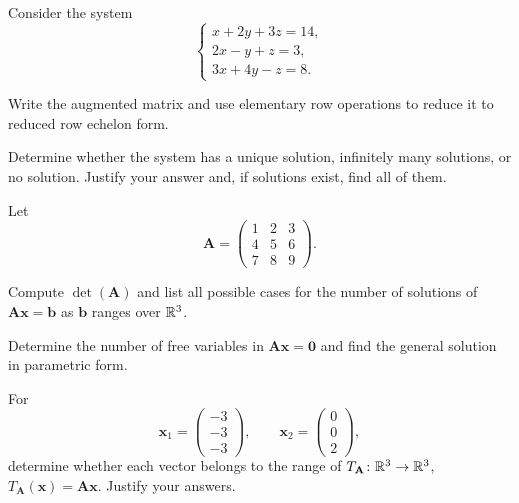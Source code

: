 \begin{problem}
Consider the system
\[
\begin{cases}
x+2y+3z=14,\\
2x-y+z=3,\\
3x+4y-z=8.
\end{cases}
\]
\begin{problemsubparts}
\item Write the augmented matrix and use elementary row operations to reduce it to reduced row echelon form.
\item Determine whether the system has a unique solution, infinitely many solutions, or no solution. Justify your answer and, if solutions exist, find all of them.
\end{problemsubparts}
\end{problem}

\begin{problem}
Let
\[
\mathbf A=
\begin{pmatrix}
1&2&3\\
4&5&6\\
7&8&9
\end{pmatrix}.
\]
\begin{problemsubparts}
\item Compute $\det(\mathbf A)$ and list all possible cases for the number of solutions of $\mathbf A\mathbf x=\mathbf b$ as $\mathbf b$ ranges over $\mathbb{R}^3$.
\item Determine the number of free variables in $\mathbf A\mathbf x=\mathbf0$ and find the general solution in parametric form.
\item For
\[
\mathbf x_1=\begin{pmatrix}-3\\-3\\-3\end{pmatrix},
\qquad
\mathbf x_2=\begin{pmatrix}0\\0\\2\end{pmatrix},
\]
determine whether each vector belongs to the range of $T_{\mathbf A}\colon\mathbb{R}^3\to\mathbb{R}^3$, $T_{\mathbf A}(\mathbf x)=\mathbf A\mathbf x$. Justify your answers.
\end{problemsubparts}
\end{problem}


